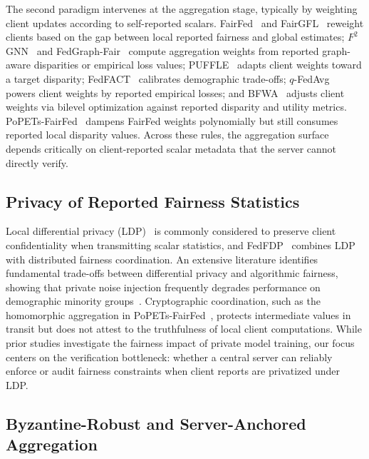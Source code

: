 The second paradigm intervenes at the aggregation stage, typically by weighting client updates according to self-reported scalars. FairFed~\citep{ezzeldin2023fairfed} and FairGFL~\citep{zhou2026fairgfl} reweight clients based on the gap between local reported fairness and global estimates; $F^2$GNN~\citep{f2gnn2023} and FedGraph-Fair~\citep{khan2026fedgraphfair} compute aggregation weights from reported graph-aware disparities or empirical loss values; PUFFLE~\citep{corbucci2024puffle} adapts client weights toward a target disparity; FedFACT~\citep{fedfact2025} calibrates demographic trade-offs; $q$-FedAvg~\citep{li2020fair} powers client weights by reported empirical losses; and BFWA~\citep{dang2026fedfairgnn} adjusts client weights via bilevel optimization against reported disparity and utility metrics. PoPETs-FairFed~\citep{bendoukha2025popets} dampens FairFed weights polynomially but still consumes reported local disparity values. Across these rules, the aggregation surface depends critically on client-reported scalar metadata that the server cannot directly verify.

\subsection{Privacy of Reported Fairness Statistics}
\label{subsec:rw_privacy}

Local differential privacy (LDP)~\citep{dwork2014algorithmic, mironov2017renyi} is commonly considered to preserve client confidentiality when transmitting scalar statistics, and FedFDP~\citep{ling2024feddp} combines LDP with distributed fairness coordination. An extensive literature identifies fundamental trade-offs between differential privacy and algorithmic fairness, showing that private noise injection frequently degrades performance on demographic minority groups~\citep{bagdasaryan2019differential, cummings2019compatibility, tran2021dperm, fioretto2022survey}. Cryptographic coordination, such as the homomorphic aggregation in PoPETs-FairFed~\citep{bendoukha2025popets}, protects intermediate values in transit but does not attest to the truthfulness of local client computations. While prior studies investigate the fairness impact of private model training, our focus centers on the verification bottleneck: whether a central server can reliably enforce or audit fairness constraints when client reports are privatized under LDP.

\subsection{Byzantine-Robust and Server-Anchored Aggregation}
\label{subsec:rw_robust}


